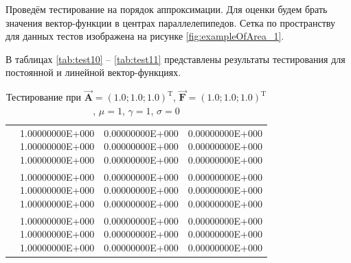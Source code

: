Проведём тестирование на порядок аппроксимации. Для оценки будем брать значения вектор-функции в центрах параллелепипедов. Сетка по пространству для данных тестов изображена на рисунке \ref{fig:exampleOfArea_1}.


В таблицах \ref{tab:test10} -- \ref{tab:test11} представлены результаты тестирования для постоянной и линейной вектор-функциях.

\begin{table}
	\caption{Тестирование при $\overrightarrow{\textbf{A}} = (1.0; 1.0; 1.0)^{\text{T}}$, $\overrightarrow{\textbf{F}} = (1.0; 1.0; 1.0)^{\text{T}}$, $\mu = 1$, $\gamma = 1$, $\sigma = 0$}
	\centering
	\small
	\begin{tabularx}{1.0\textwidth}{| >{\raggedright\arraybackslash}X | >{\raggedright\arraybackslash}X | >{\raggedright\arraybackslash}X |>{\raggedright\arraybackslash}X |}
		\hline
		\centering{Ребро} & \centering{Значение} & \centering{Абсолютная погрешность} & \centering{Относительная погрешность} \tabularnewline \hline
		
		
		\centering{($0.5; 0.5; 0.5$)} & \centering{1.00000000E+000 \\ 1.00000000E+000\\
			1.00000000E+000}& \centering{0.00000000E+000 \\ 0.00000000E+000 \\ 0.00000000E+000} & \centering{0.00000000E+000 \\ 0.00000000E+000 \\ 0.00000000E+000} \tabularnewline \hline
		
		\centering{($1.5; 0.5; 0.5$)} & \centering{1.00000000E+000 \\ 1.00000000E+000\\
			1.00000000E+000}& \centering{0.00000000E+000 \\ 0.00000000E+000 \\ 0.00000000E+000} & \centering{0.00000000E+000 \\ 0.00000000E+000 \\ 0.00000000E+000} \tabularnewline \hline
		
		\centering{($0.5; 1.5; 0.5$)} & \centering{1.00000000E+000 \\ 1.00000000E+000\\
			1.00000000E+000}& \centering{0.00000000E+000 \\ 0.00000000E+000 \\ 0.00000000E+000} & \centering{0.00000000E+000 \\ 0.00000000E+000 \\ 0.00000000E+000} \tabularnewline \hline
		

\end{tabularx}
\end{table}
